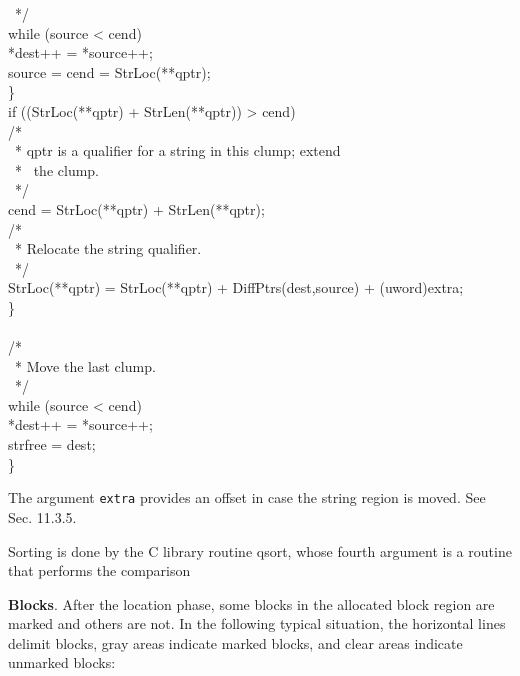 {\>\>\>\ */\\
\>\>\>while (source < cend)\\
\>\>\>\>*dest++ = *source++;\\
\>\>\>source = cend = StrLoc(**qptr);\\
\>\>\>\}\\
\>\>if ((StrLoc(**qptr) + StrLen(**qptr)) > cend)\\
\>\>\>/*\\
\>\>\>\ * qptr is a qualifier for a string in this clump; extend\\
\>\>\>\ * \ the clump.\\
\>\>\>\ */\\
\>\>\>cend = StrLoc(**qptr) + StrLen(**qptr);\\
\>\>/*\\
\>\>\ * Relocate the string qualifier.\\
\>\>\ */\\
\>\>StrLoc(**qptr) = StrLoc(**qptr) + DiffPtrs(dest,source) + (uword)extra;\\
\>\>\}\\
\\
\>/*\\
\>\ * Move the last clump.\\
\>\ */\\
\>while (source < cend)\\
\>\>*dest++ = *source++;\\
\>strfree = dest;\\
\>\}
}


The argument \texttt{extra} provides an offset in case the string region is
moved. See Sec. 11.3.5.

Sorting is done by the C library routine qsort, whose fourth argument
is a routine that performs the comparison



\textbf{Blocks}. After the location phase, some blocks in the
allocated block region are marked and others are not. In the following
typical situation, the horizontal lines delimit blocks, gray areas
indicate marked blocks, and clear areas indicate unmarked blocks:


